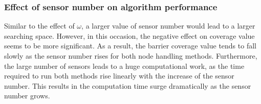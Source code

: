 \subsubsection{Effect of sensor number on algorithm performance}

Similar to the effect of $\omega$, a larger value of sensor number would lead to a larger searching space. However, in this occasion, the negative effect on coverage value seems to be more significant. As a result, the barrier coverage value tends to fall slowly as the sensor number rises for both node handling methods. Furthermore, the large number of sensors leads to a huge computational work, as the time required to run both methods rise linearly with the increase of the sensor number. This results in the computation time surge dramatically as the sensor number grows.

